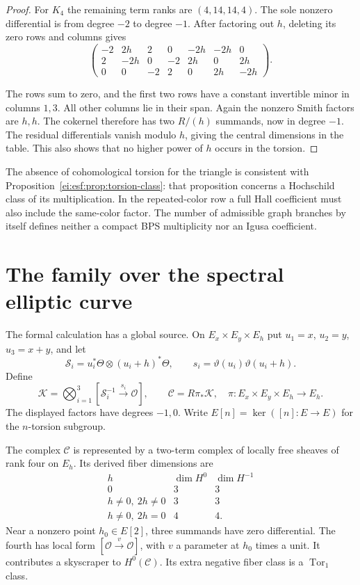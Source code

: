 \begin{proof}
For $K_4$ the remaining term ranks are $(4,14,14,4)$.
The sole nonzero differential is from degree $-2$ to
degree $-1$. After factoring out $h$, deleting its zero
rows and columns gives
\[
 \begin{pmatrix}
 -2&2h&2&0&-2h&-2h&0\\
 2&-2h&0&-2&2h&0&2h\\
 0&0&-2&2&0&2h&-2h
 \end{pmatrix}.
\]

The rows sum to zero, and the first two rows have a
constant invertible minor in columns $1,3$. All other
columns lie in their span. Again the nonzero Smith
factors are $h,h$. The cokernel therefore has two
$R/(h)$ summands, now in degree $-1$.
The residual differentials vanish modulo $h$, giving
the central dimensions in the table. This also shows
that no higher power of $h$ occurs in the torsion.
\end{proof}

The absence of cohomological torsion for the triangle
is consistent with Proposition~\ref{ei:esf:prop:torsion-class}:
that proposition concerns a Hochschild class of its
multiplication. In the repeated-color row a full Hall
coefficient must also include the same-color factor.
The number of admissible graph branches by itself
defines neither a compact BPS multiplicity nor an Igusa
coefficient.


\section{The family over the spectral elliptic curve}
\label{ei:sec:global-family}

The formal calculation has a global source. On
$E_x\times E_y\times E_h$ put $u_1=x$, $u_2=y$, $u_3=x+y$,
and let
\[
 \mathcal S_i=u_i^*\Theta\otimes(u_i+h)^*\Theta,
 \qquad s_i=\vartheta(u_i)\vartheta(u_i+h).
\]
Define
\begin{equation}\label{ei:esf:eq:global}
 \mathscr K=\bigotimes_{i=1}^3
    [\mathcal S_i^{-1}\xrightarrow{s_i}\mathcal O],
 \qquad
 \mathscr C=R\pi_*\mathscr K,
 \quad\pi:E_x\times E_y\times E_h\to E_h.
\end{equation}
The displayed factors have degrees $-1,0$.
Write $E[n]=\ker([n]:E\to E)$ for the $n$-torsion subgroup.

\begin{theorem}\label{ei:esf:thm:global-fibers}
The complex $\mathscr C$ is represented by a two-term
complex of locally free sheaves of rank four on $E_h$.
Its derived fiber dimensions are
\[
 \begin{array}{c|cc}
  h&\dim H^0&\dim H^{-1}\\\hline
  0&3&3\\
  h\ne0,\ 2h\ne0&3&3\\
  h\ne0,\ 2h=0&4&4.
 \end{array}
\]
Near a nonzero point $h_0\in E[2]$, three summands have
zero differential. The fourth has local form
$[\mathcal O\xrightarrow{v}\mathcal O]$, with $v$ a
parameter at $h_0$ times a unit.
It contributes a skyscraper to $H^0(\mathscr C)$.
Its extra negative fiber class is a $\operatorname{Tor}_1$ class.
\end{theorem}

